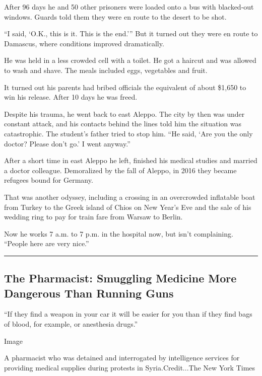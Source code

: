 After 96 days he and 50 other prisoners were loaded onto a bus with
blacked-out windows. Guards told them they were en route to the desert
to be shot.

``I said, `O.K., this is it. This is the end.''' But it turned out they
were en route to Damascus, where conditions improved dramatically.

He was held in a less crowded cell with a toilet. He got a haircut and
was allowed to wash and shave. The meals included eggs, vegetables and
fruit.

It turned out his parents had bribed officials the equivalent of about
\$1,650 to win his release. After 10 days he was freed.

Despite his trauma, he went back to east Aleppo. The city by then was
under constant attack, and his contacts behind the lines told him the
situation was catastrophic. The student's father tried to stop him. ``He
said, `Are you the only doctor? Please don't go.' I went anyway.''

After a short time in east Aleppo he left, finished his medical studies
and married a doctor colleague. Demoralized by the fall of Aleppo, in
2016 they became refugees bound for Germany.

That was another odyssey, including a crossing in an overcrowded
inflatable boat from Turkey to the Greek island of Chios on New Year's
Eve and the sale of his wedding ring to pay for train fare from Warsaw
to Berlin.

Now he works 7 a.m. to 7 p.m. in the hospital now, but isn't
complaining. ``People here are very nice.''

\begin{center}\rule{0.5\linewidth}{\linethickness}\end{center}

\hypertarget{the-pharmacist-smuggling-medicine-more-dangerous-than-running-guns}{%
\subsection{The Pharmacist: Smuggling Medicine More Dangerous Than
Running
Guns}\label{the-pharmacist-smuggling-medicine-more-dangerous-than-running-guns}}

``If they find a weapon in your car it will be easier for you than if
they find bags of blood, for example, or anesthesia drugs.''

Image

A pharmacist who was detained and interrogated by intelligence services
for providing medical supplies during protests in Syria.Credit...The New
York Times

